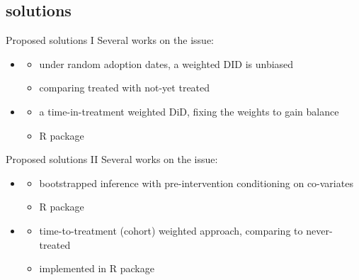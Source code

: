 \documentclass[aspectratio=169]{beamer}
\begin{document}
	\subsection{solutions}
		\begin{frame}{Proposed solutions I}
			Several works on the issue:
			\\ \vspace*{.25cm}
			\begin{itemize}
				\item<2-> \cite{Athey2020}
					\begin{itemize}
						\item under random adoption dates, a weighted DID is unbiased
						\item comparing treated with not-yet treated
					\end{itemize}
				\item<3-> \cite{Goodman-Bacon2021}
					\begin{itemize}
						\item a time-in-treatment weighted DiD, fixing the weights to gain balance
						\item R package \href{https://cran.r-project.org/web/packages/bacondecomp/index.html}{\underline{}}
					\end{itemize}
			\end{itemize}
		\end{frame}

		\begin{frame}{Proposed solutions II}
			Several works on the issue:
			\\ \vspace*{.25cm}
			\begin{itemize}
				\item<2-> \cite{Callaway2020}
					\begin{itemize}
						\item bootstrapped inference with pre-intervention conditioning on co-variates
						\item R package \href{https://cran.r-project.org/web/packages/did/vignettes/did-basics.html}{\underline{}}
					\end{itemize}
				\item<3-> \cite{Sun2020a}
					\begin{itemize}
						\item time-to-treatment (cohort) weighted approach, comparing to never-treated
						\item implemented in \href{https://cran.r-project.org/web/packages/fixest/vignettes/fixest_walkthrough.html}{\underline{}} R package
					\end{itemize}
			\end{itemize}
		\end{frame}
\end{document}
